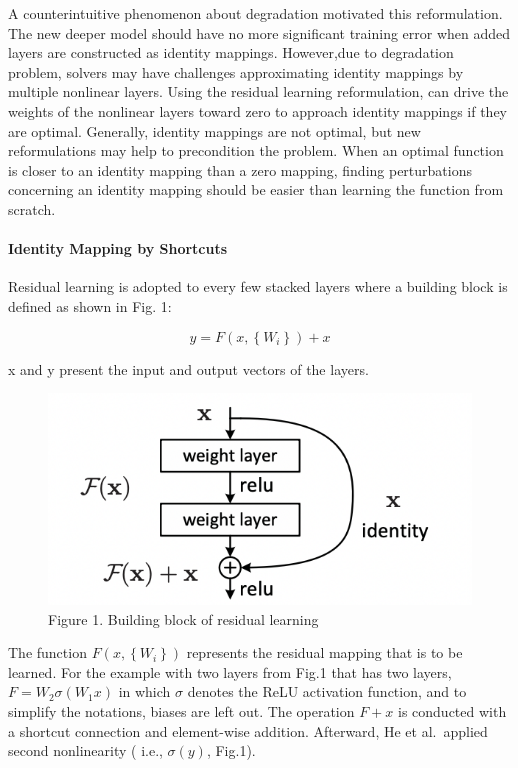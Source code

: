 \documentclass[
]{krantz}
\begin{document}
A counterintuitive phenomenon about degradation motivated this reformulation. The new deeper model should have no more significant training error when added layers are constructed as identity mappings. However,due to degradation problem, solvers may have challenges approximating identity mappings by multiple nonlinear layers. Using the residual learning reformulation, can drive the weights of the nonlinear layers toward zero to approach identity mappings if they are optimal.
Generally, identity mappings are not optimal, but new reformulations may help to precondition the problem. When an optimal function is closer to an identity mapping than a zero mapping, finding perturbations concerning an identity mapping should be easier than learning the function from scratch.

\hypertarget{identity-mapping-by-shortcuts}{%
\paragraph{Identity Mapping by Shortcuts}\label{identity-mapping-by-shortcuts}}

Residual learning is adopted to every few stacked layers where a building block is defined as shown in Fig. 1:

\begin{equation}
\tag{1}
y = F  \left( x,\left\{  W_i\right\} \right) + x
\end{equation}

x and y present the input and output vectors of the layers.

\begin{figure}

{\centering \includegraphics[width=0.35\linewidth]{./figures/01-chapter1/resnetBlock} 

}

\caption{Figure 1. Building block of residual learning}\label{fig:ch01-figure01}
\end{figure}

The function \(F \left( x,\left\{ W_i\right\} \right)\) represents the residual mapping that is to be learned. For the example with two layers from Fig.1 that has two layers, \(F = W_2\sigma\left( W_1x\right)\) in which \(\sigma\) denotes the ReLU activation function, and to simplify the notations, biases are left out. The operation \(F + x\) is conducted with a shortcut connection and element-wise addition. Afterward, He et al.~applied second nonlinearity ( i.e., \(\sigma \left( y \right)\), Fig.1).
\end{document}
